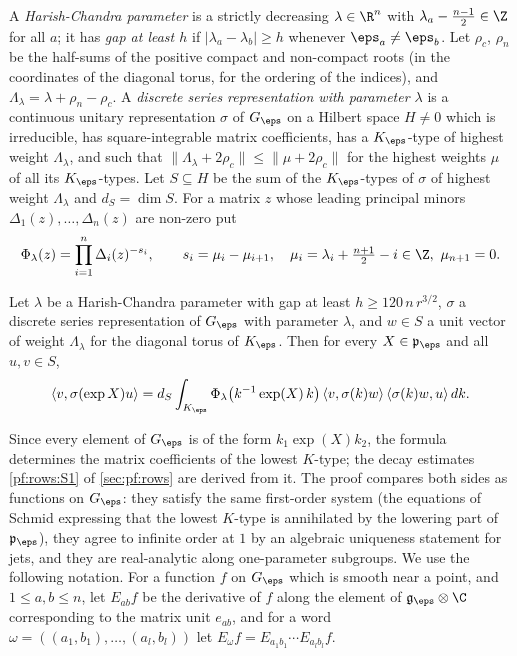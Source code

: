 A \emph{Harish-Chandra parameter} is a strictly decreasing $\lambda\in\R^n$ with $\lambda_a-\frac{n-1}2\in\Z$ for all
$a$; it has \emph{gap at least $h$} if $|\lambda_a-\lambda_b|\ge h$ whenever $\eps_a\ne\eps_b$. Let $\rho_c$, $\rho_n$ be the
half-sums of the positive compact and non-compact roots (in the coordinates of the diagonal torus, for the ordering
of the indices), and $\Lambda_\lambda=\lambda+\rho_n-\rho_c$. A \emph{discrete series representation with parameter
$\lambda$} is a continuous unitary representation $\sigma$ of $G_\eps$ on a Hilbert space $H\ne0$ which is irreducible,
has square-integrable matrix coefficients, has a $K_\eps$-type of highest weight $\Lambda_\lambda$, and such that
$\|\Lambda_\lambda+2\rho_c\|\le\|\mu+2\rho_c\|$ for the highest weights $\mu$ of all its $K_\eps$-types. Let
$S\subseteq H$ be the sum of the $K_\eps$-types of $\sigma$ of highest weight $\Lambda_\lambda$ and $d_S=\dim S$. For a
matrix $z$ whose leading principal minors $\Delta_1(z),\dots,\Delta_n(z)$ are non-zero put
\[
\Phi_\lambda(z)=\prod_{i=1}^n\Delta_i(z)^{-s_i},\qquad s_i=\mu_i-\mu_{i+1},\quad \mu_i=\lambda_i+\tfrac{n+1}2-i\in\Z,\
\mu_{n+1}=0 .
\]

\begin{theorem}[Compression formula for the lowest $K$-type]\label{pf:sh-flag:formulagap}
Let $\lambda$ be a Harish-Chandra parameter with gap at least $h\ge120\,n\,r^{3/2}$, $\sigma$ a discrete series
representation of $G_\eps$ with parameter $\lambda$, and $w\in S$ a unit vector of weight $\Lambda_\lambda$ for the
diagonal torus of $K_\eps$. Then for every $X\in\mathfrak p_\eps$ and all $u,v\in S$,
\begin{equation}\label{pf:sh-flag:eq:compression}
\langle v,\sigma(\exp X)u\rangle=d_S\int_{K_\eps}\Phi_\lambda\bigl(k^{-1}\exp(X)\,k\bigr)\,
\langle v,\sigma(k)w\rangle\,\langle\sigma(k)w,u\rangle\,dk .
\end{equation}
\end{theorem}

Since every element of $G_\eps$ is of the form $k_1\exp(X)k_2$, the formula determines the matrix coefficients of the
lowest $K$-type; the decay estimates \ref{pf:rows:S1} of \cref{sec:pf:rows} are derived from it. The proof compares
both sides as functions on $G_\eps$: they satisfy the same first-order system (the equations of Schmid expressing that
the lowest $K$-type is annihilated by the lowering part of $\mathfrak p_\eps$), they agree to infinite order at $1$ by an
algebraic uniqueness statement for jets, and they are real-analytic along one-parameter subgroups. We use the
following notation. For a function $f$ on $G_\eps$ which is smooth near a point, and $1\le a,b\le n$, let $E_{ab}f$ be the
derivative of $f$ along the element of $\mathfrak g_\eps\otimes\C$ corresponding to the matrix unit $e_{ab}$, and for a word
$\omega=((a_1,b_1),\dots,(a_l,b_l))$ let $E_\omega f=E_{a_1b_1}\cdots E_{a_lb_l}f$.

